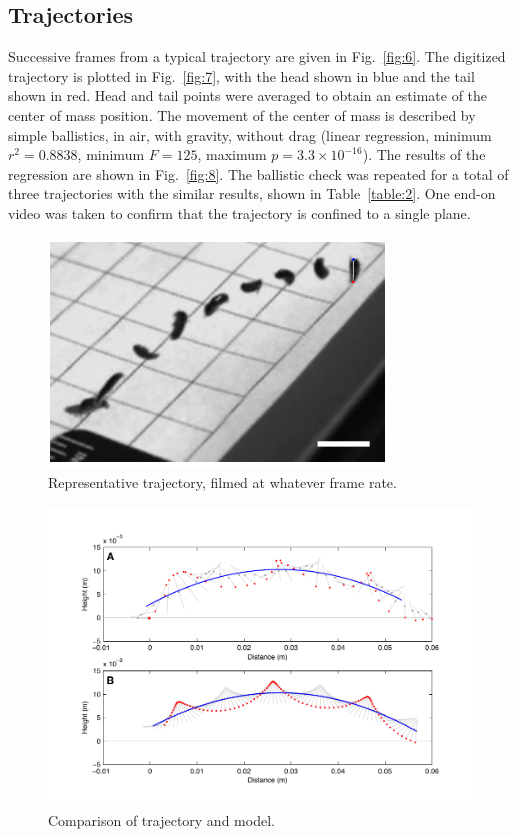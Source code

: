 \documentclass{article}
\begin{document}
\subsection*{Trajectories}
	Successive frames from a typical trajectory are given in Fig.~\ref{fig:6}.  The digitized trajectory is plotted in Fig.~\ref{fig:7}, with the head shown in blue and the tail shown in red.  Head and tail points were averaged to obtain an estimate of the center of mass position.  The movement of the center of mass is described by simple ballistics, in air, with gravity, without drag (linear regression, minimum $r^2=0.8838$, minimum $F=125$, maximum $p=3.3 \times 10^{-16}$).  The results of the regression are shown in Fig.~\ref{fig:8}.  The ballistic check was repeated for a total of three trajectories with the similar results, shown in Table~\ref{table:2}.  One end-on video was taken to confirm that the trajectory is confined to a single plane.
\begin{figure}
\begin{center}
\includegraphics{figures/HyaleTrajectoryPhoto.pdf}
\end{center}
\caption{Representative trajectory, filmed at whatever frame rate.}
\end{figure}

\begin{figure}
\begin{center}
\includegraphics{figures/AmphipodTrajectoriesFull.pdf}
\end{center}
\caption{Comparison of trajectory and model.}
\end{figure}
\end{document}
